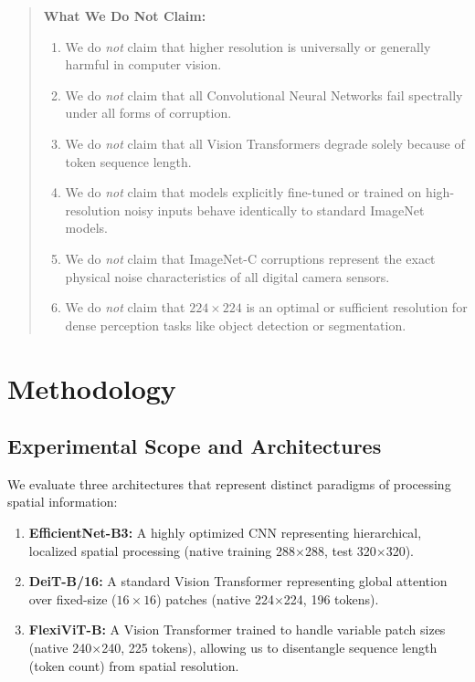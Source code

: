\documentclass[10pt,twocolumn,letterpaper]{article}
\begin{document}
\begin{quote}
\noindent\textbf{What We Do Not Claim:}
\begin{enumerate}
    \item We do \textit{not} claim that higher resolution is universally or generally harmful in computer vision.
    \item We do \textit{not} claim that all Convolutional Neural Networks fail spectrally under all forms of corruption.
    \item We do \textit{not} claim that all Vision Transformers degrade solely because of token sequence length.
    \item We do \textit{not} claim that models explicitly fine-tuned or trained on high-resolution noisy inputs behave identically to standard ImageNet models.
    \item We do \textit{not} claim that ImageNet-C corruptions represent the exact physical noise characteristics of all digital camera sensors.
    \item We do \textit{not} claim that $224\times224$ is an optimal or sufficient resolution for dense perception tasks like object detection or segmentation.
\end{enumerate}
\end{quote}

\section{Methodology}

\subsection{Experimental Scope and Architectures}
We evaluate three architectures that represent distinct paradigms of processing spatial information:
\begin{enumerate}
    \item \textbf{EfficientNet-B3:} A highly optimized CNN representing hierarchical, localized spatial processing (native training 288$\times$288, test 320$\times$320).
    \item \textbf{DeiT-B/16:} A standard Vision Transformer representing global attention over fixed-size ($16\times16$) patches (native 224$\times$224, 196 tokens).
    \item \textbf{FlexiViT-B:} A Vision Transformer trained to handle variable patch sizes (native 240$\times$240, 225 tokens), allowing us to disentangle sequence length (token count) from spatial resolution.
\end{enumerate}
\end{document}
